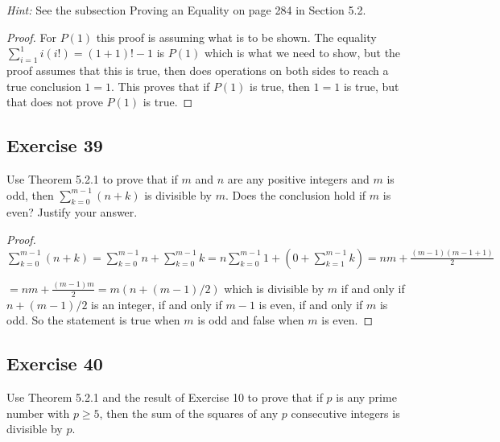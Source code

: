 \documentclass[14pt]{extarticle}
\newcommand{\dps}{\displaystyle}
\begin{document}
    {\it Hint:} See the subsection Proving an Equality on page 284 in Section 5.2.

\begin{proof}
    For $P(1)$ this proof is assuming what is to be shown. The equality \\ $\dps \sum_{i=1}^{1}i(i!) = (1+1)! - 1$ is $P(1)$ which is what we need to show, but the proof assumes that this is true, then does operations on both sides to reach a true conclusion $1 = 1$. This proves that if $P(1)$ is true, then $1 = 1$ is true, but that does not prove $P(1)$ is true.
\end{proof}

\subsection{Exercise 39}
Use Theorem 5.2.1 to prove that if $m$ and $n$ are any positive integers and $m$ is odd, then $\dps \sum_{k=0}^{m-1}(n+k)$ is divisible by $m$. Does the conclusion hold if $m$ is even? Justify your answer.

\begin{proof}
    $\dps \sum_{k=0}^{m-1}(n+k) = \sum_{k=0}^{m-1}n + \sum_{k=0}^{m-1}k = n\sum_{k=0}^{m-1}1 + (0 + \sum_{k=1}^{m-1}k) = nm + \frac{(m-1)(m-1+1)}{2}$

    $\dps = nm + \frac{(m-1)m}{2} = m(n + (m-1)/2)$ which is divisible by $m$ if and only if $n + (m-1)/2$ is an integer, if and only if $m-1$ is even, if and only if $m$ is odd. So the statement is true when $m$ is odd and false when $m$ is even.
\end{proof}

\subsection{Exercise 40}
Use Theorem 5.2.1 and the result of Exercise 10 to prove that if $p$ is any prime number with $p \geq 5$, then the sum of the squares of any $p$ consecutive integers is divisible by $p$.
\end{document}
